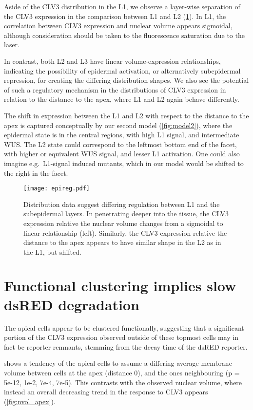 Aside of the CLV3 distribution in the L1, we observe a layer-wise separation of
the CLV3 expression in the comparison between
L1 and L2 (\cref{fig:epireg}). In L1, the correlation between
CLV3 expression and nuclear volume appears sigmoidal, although consideration
should be taken to the fluorescence saturation due to the laser. 

In contrast, both L2 and L3 have linear volume-expression relationships,
indicating the possibility of epidermal  
activation, or alternatively subepidermal repression, for creating the differing
distribution shapes. We also see the potential of such a regulatory mechanism in
the distributions of CLV3 expression in relation to the distance to the apex,
where L1 and L2 again behave differently.

The shift in expression between the L1
and L2 with respect to the  
distance to the apex is captured conceptually by our second model
(\cref{fig:model2}), where the
epidermal state is in the central regions, with high L1 signal, and intermediate
WUS. The L2 state could correspond to the leftmost bottom end of the facet, with
higher or equivalent WUS signal, and lesser L1 activation. One could also
imagine e.g.\ L1-signal induced mutants, which in our model would be shifted to
the right in the facet.

\begin{figure}[H]
  \centering
  \texttt{[image: epireg.pdf]}
  \caption[Cues of epidermal regulation]{Distribution data suggest differing
    regulation between L1 and the subepidermal layers. In penetrating deeper
    into the tissue, the CLV3 expression relative the nuclear volume changes
    from a sigmoidal to linear relationship (left). Similarly, the CLV3
    expression relative the distance to the apex appears to have similar shape
    in the L2 as in the L1,
    but shifted.}
  \label{fig:epireg}
\end{figure}

 \section{Functional clustering implies slow dsRED degradation}
 The apical cells appear to be clustered functionally, suggesting that a
 significant portion of the CLV3 expression observed outside of these topmost
 cells may in fact be reporter remnants, stemming from the decay time of the
 dsRED reporter. 
 
  shows a tendency of the apical cells to
 assume a differing average membrane volume between cells at the apex (distance
 0), and the
 ones neighbouring (p = 5e-12, 1e-2, 7e-4, 7e-5). This
 contrasts with the observed nuclear volume, where instead an overall decreasing
 trend in the response to CLV3 appears (\cref{fig:nvol_apex}).
 
